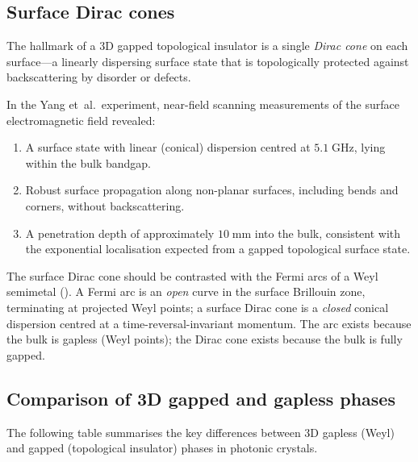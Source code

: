 \subsection{Surface Dirac cones}
\label{sec:ch15-surface-dirac}

The hallmark of a 3D gapped topological insulator is a single
\emph{Dirac cone} on each surface---a linearly dispersing surface
state that is topologically protected against backscattering by
disorder or defects.

In the Yang et~al.\ experiment, near-field scanning measurements of
the surface electromagnetic field revealed:
\begin{enumerate}
  \item A surface state with linear (conical) dispersion centred at
  $5.1\;\mathrm{GHz}$, lying within the bulk bandgap.
  \item Robust surface propagation along non-planar surfaces,
  including bends and corners, without backscattering.
  \item A penetration depth of approximately $10\;\mathrm{mm}$ into
  the bulk, consistent with the exponential localisation expected from
  a gapped topological surface state.
\end{enumerate}

The surface Dirac cone should be contrasted with the Fermi arcs of a
Weyl semimetal ().  A Fermi arc is an
\emph{open} curve in the surface Brillouin zone, terminating at
projected Weyl points; a surface Dirac cone is a \emph{closed} conical
dispersion centred at a time-reversal-invariant momentum.  The arc
exists because the bulk is gapless (Weyl points); the Dirac cone exists
because the bulk is fully gapped.

\subsection{Comparison of 3D gapped and gapless phases}
\label{sec:ch15-gapped-vs-gapless}

The following table summarises the key differences between 3D gapless
(Weyl) and gapped (topological insulator) phases in photonic crystals.

